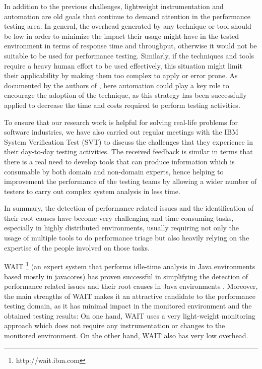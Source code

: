 \documentclass[runningheads,a4paper]{llncs}
\begin{document}
In addition to the previous challenges, lightweight instrumentation and
automation are old goals that continue to demand attention in the performance
testing area. In general, the overhead generated by any technique or tool
should be low in order to minimize the impact their usage might have in the
tested environment in terms of response time and throughput, otherwise it would not be
suitable to be used for performance testing. Similarly, if the techniques and
tools require a heavy human effort to be used effectively, this situation might limit 
their applicability by making them too complex to apply or error prone. As
documented by the authors of \cite{Shahamiri1}, here automation could play a key
role to encourage the adoption of the technique, as this strategy has been
successfully applied to decrease the time and costs required to perform
testing activities.

To ensure that our research work is helpful for solving real-life problems for
software industries, we have also carried out regular meetings with the IBM
System Verification Test (SVT) to discuss the challenges that they experience in
their day-to-day testing activities. The received feedback is similar in terms
that there is a real need to develop tools that can produce information which is
consumable by both domain and non-domain experts, hence helping to improvement the 
performance of the testing teams by allowing a wider number of testers to carry out 
complex system analysis in less time.

In summary, the detection of performance related issues and the identification
of their root causes have become very challenging and time consuming tasks,
especially in highly distributed environments, usually requiring not only the
usage of multiple tools to do performance triage but also heavily relying on
the expertise of the people involved on those tasks.

WAIT \footnote{http://wait.ibm.com} (an expert system that performs idle-time
analysis in Java environments based mostly in javacores) has proven successful
in simplifying the detection of performance related issues and their root causes 
in Java environments \cite{Altman2010,Wu1}. Moreover, the main strengths of WAIT
makes it an attractive candidate to the performance testing domain, as it has minimal 
impact in the monitored environment and the obtained testing results: On one
hand, WAIT uses a very light-weight monitoring approach which does not require 
any instrumentation or changes to the monitored environment. On the other hand,
WAIT also has very low overhead.
\end{document}
